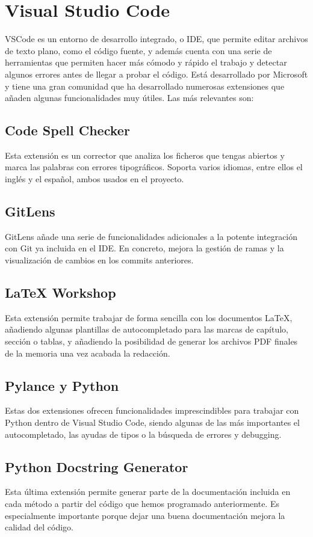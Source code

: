 \section{Visual Studio Code}
VSCode es un entorno de desarrollo integrado, o IDE, que permite editar archivos de texto plano, como el código fuente, y además cuenta con una serie de herramientas que permiten hacer más cómodo y rápido el trabajo y detectar algunos errores antes de llegar a probar el código. Está desarrollado por Microsoft y tiene una gran comunidad que ha desarrollado numerosas extensiones que añaden algunas funcionalidades muy útiles. Las más relevantes son:
\subsection{Code Spell Checker}
Esta extensión es un corrector que analiza los ficheros que tengas abiertos y marca las palabras con errores tipográficos. Soporta varios idiomas, entre ellos el inglés y el español, ambos usados en el proyecto.
\subsection{GitLens}
GitLens añade una serie de funcionalidades adicionales a la potente integración con Git ya incluida en el IDE. En concreto, mejora la gestión de ramas y la visualización de cambios en los commits anteriores.
\subsection{LaTeX Workshop}
Esta extensión permite trabajar de forma sencilla con los documentos LaTeX, añadiendo algunas plantillas de autocompletado para las marcas de capítulo, sección o tablas, y añadiendo la posibilidad de generar los archivos PDF finales de la memoria una vez acabada la redacción.
\subsection{Pylance y Python}
Estas dos extensiones ofrecen funcionalidades imprescindibles para trabajar con Python dentro de Visual Studio Code, siendo algunas de las más importantes el autocompletado, las ayudas de tipos o la búsqueda de errores y debugging.
\subsection{Python Docstring Generator}
Esta última extensión permite generar parte de la documentación incluida en cada método a partir del código que hemos programado anteriormente. Es especialmente importante porque dejar una buena documentación mejora la calidad del código.

